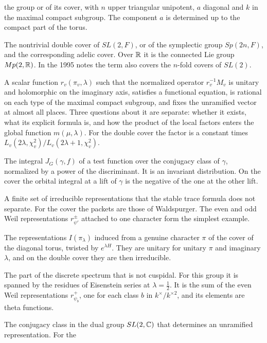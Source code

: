 \begin{description}
  the group or of its cover, with $n$ upper triangular unipotent, $a$
  diagonal and $k$ in the maximal compact subgroup. The component $a$ is
  determined up to the compact part of the torus.
\item[Metaplectic group.] The nontrivial double cover of $SL(2,F)$, or
  of the symplectic group $Sp(2n,F)$, and the corresponding adelic cover.
  Over $\mathbb{R}$ it is the connected Lie group $Mp(2,\mathbb{R})$. In the 1995 notes
  the term also covers the $n$-fold covers of $SL(2)$.
\item[Normalizing factor.] A scalar function $r_v(\pi_v,\lambda)$ such
  that the normalized operator $r_v^{-1}M_v$ is unitary and holomorphic
  on the imaginary axis, satisfies a functional equation, is rational on
  each type of the maximal compact subgroup, and fixes the unramified
  vector at almost all places. Three questions about it are separate:
  whether it exists, what its explicit formula is, and how the product of
  the local factors enters the global function $m(\mu,\lambda)$. For the
  double cover the factor is a constant times $L_v(2\lambda,\chi_v^2)/
  L_v(2\lambda+1,\chi_v^2)$.
\item[Orbital integral.] The integral $J_G(\gamma,f)$ of a test function
  over the conjugacy class of $\gamma$, normalized by a power of the
  discriminant. It is an invariant distribution. On the cover the
  orbital integral at a lift of $\gamma$ is the negative of the one at
  the other lift.
\item[Packet.] A finite set of irreducible representations that the
  stable trace formula does not separate. For the cover the packets are
  those of Waldspurger. The even and odd Weil representations
  $r^\pm_{\psi'}$ attached to one character form the simplest example.
\item[Principal series.] The representations $I(\pi_\lambda)$ induced
  from a genuine character $\pi$ of the cover of the diagonal torus,
  twisted by $e^{\lambda H}$. They are unitary for unitary $\pi$ and
  imaginary $\lambda$, and on the double cover they are then irreducible.
\item[Residual spectrum.] The part of the discrete spectrum that is not
  cuspidal. For this group it is spanned by the residues of Eisenstein
  series at $\lambda=\frac12$. It is the sum of the even Weil
  representations $r^+_{\psi_b}$, one for each class $b$ in
  $k^\times/k^{\times2}$, and its elements are theta functions.
\item[Satake parameter.] The conjugacy class in the dual group
  $SL(2,\mathbb{C})$ that determines an unramified representation. For the

\end{description}
